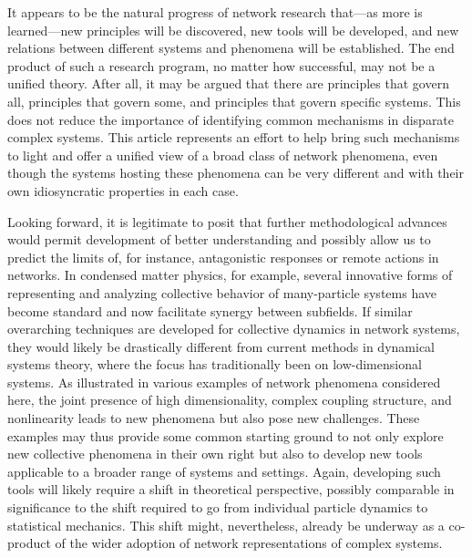 \documentclass[
preprint,
superscriptaddress,
aps,
prl,
]{revtex4-1}
\begin{document}
{It appears to be the natural progress of network research that---as more is learned---new  principles 
will be
 discovered,
new tools
will be
developed, and new relations between different systems and phenomena 
will be
established. 
The end product of such a research program, no matter how successful, may not be a unified theory. After all, it may be
argued that there are
principles that govern all, principles that govern some, and principles that govern specific systems. 
This does not reduce the importance of identifying common mechanisms in disparate complex systems.
This article  represents an effort to help 
bring such mechanisms to light and offer a unified view of a broad class of network 
phenomena, even though the systems hosting these phenomena can be very different and with their own idiosyncratic properties in each case.
}

{\color{black}
Looking forward, 
it is  legitimate 
to posit that
further  methodological advances would permit 
development of better understanding
and possibly allow us to} 
predict the limits of, for instance, antagonistic responses or remote actions in networks.
In condensed matter physics,
 {\color{black} for example,}
several innovative  
forms of representing and analyzing collective  
behavior of many-particle systems have 
become standard {\color{black} and now facilitate synergy between subfields.} 
 {\color{black} 
If similar 
overarching 
techniques are developed for
collective dynamics in network systems,} 
they would likely 
be drastically different from
{\color{black} current methods}
in dynamical systems theory,  
where the focus has traditionally been 
{\color{black} on}
 low-dimensional systems.
As illustrated
{\color{black} in various examples of network phenomena considered here,}
the joint presence of  high dimensionality, complex coupling  structure,
and nonlinearity 
{\color{black} leads}
to new phenomena but also pose new challenges.
{\color{black} These examples}
may thus provide some common starting ground to not only  
explore new collective phenomena in their own right but also to develop 
new tools applicable to a broader range of systems and settings. 
{\color{black} Again, developing}
such tools will likely require 
a  shift in theoretical perspective, possibly comparable in significance to the shift required to go from individual particle dynamics  to statistical mechanics.
{\color{black} This shift might, nevertheless, already be underway as a  
co-product 
of the wider adoption of network representations of complex systems.}
\end{document}
